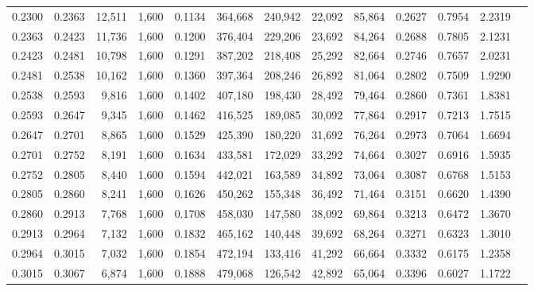 \begin{tabular}{rrrrrrrrrrrrr}
0.2300 & 0.2363 & 12,511 & 1,600 &                                     0.1134 & 364,668 & 240,942 &  22,092 &  85,864 & 0.2627 & 0.7954 & 2.2319 \\
0.2363 & 0.2423 & 11,736 & 1,600 &                                     0.1200 & 376,404 & 229,206 &  23,692 &  84,264 & 0.2688 & 0.7805 & 2.1231 \\
0.2423 & 0.2481 & 10,798 & 1,600 &                                     0.1291 & 387,202 & 218,408 &  25,292 &  82,664 & 0.2746 & 0.7657 & 2.0231 \\
0.2481 & 0.2538 & 10,162 & 1,600 &                                     0.1360 & 397,364 & 208,246 &  26,892 &  81,064 & 0.2802 & 0.7509 & 1.9290 \\
0.2538 & 0.2593 &  9,816 & 1,600 &                                     0.1402 & 407,180 & 198,430 &  28,492 &  79,464 & 0.2860 & 0.7361 & 1.8381 \\
0.2593 & 0.2647 &  9,345 & 1,600 &                                     0.1462 & 416,525 & 189,085 &  30,092 &  77,864 & 0.2917 & 0.7213 & 1.7515 \\
0.2647 & 0.2701 &  8,865 & 1,600 &                                     0.1529 & 425,390 & 180,220 &  31,692 &  76,264 & 0.2973 & 0.7064 & 1.6694 \\
0.2701 & 0.2752 &  8,191 & 1,600 &                                     0.1634 & 433,581 & 172,029 &  33,292 &  74,664 & 0.3027 & 0.6916 & 1.5935 \\
0.2752 & 0.2805 &  8,440 & 1,600 &                                     0.1594 & 442,021 & 163,589 &  34,892 &  73,064 & 0.3087 & 0.6768 & 1.5153 \\
0.2805 & 0.2860 &  8,241 & 1,600 &                                     0.1626 & 450,262 & 155,348 &  36,492 &  71,464 & 0.3151 & 0.6620 & 1.4390 \\
0.2860 & 0.2913 &  7,768 & 1,600 &                                     0.1708 & 458,030 & 147,580 &  38,092 &  69,864 & 0.3213 & 0.6472 & 1.3670 \\
0.2913 & 0.2964 &  7,132 & 1,600 &                                     0.1832 & 465,162 & 140,448 &  39,692 &  68,264 & 0.3271 & 0.6323 & 1.3010 \\
0.2964 & 0.3015 &  7,032 & 1,600 &                                     0.1854 & 472,194 & 133,416 &  41,292 &  66,664 & 0.3332 & 0.6175 & 1.2358 \\
0.3015 & 0.3067 &  6,874 & 1,600 &                                     0.1888 & 479,068 & 126,542 &  42,892 &  65,064 & 0.3396 & 0.6027 & 1.1722 \\

\end{tabular}
